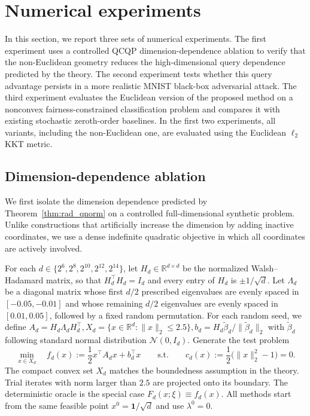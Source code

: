\documentclass[11pt]{article}
\numberwithin{equation}{section}
\begin{document}
\section{Numerical experiments}\label{sec:num}
In this section, we report three sets of numerical experiments. The first experiment uses a controlled QCQP dimension-dependence ablation to verify that the non-Euclidean geometry reduces the high-dimensional query dependence predicted by the theory. The second experiment tests whether this query advantage persists in a more realistic MNIST black-box adversarial attack. The third experiment evaluates the Euclidean version of the proposed method on a nonconvex fairness-constrained classification problem and compares it with existing stochastic zeroth-order baselines. In the first two experiments, all variants, including the non-Euclidean one, are evaluated using the Euclidean 
$\ell_2$ KKT metric.

\subsection{Dimension-dependence ablation}
\label{subsec:dimension-ablation}

We first isolate the dimension dependence predicted by {Theorem~\ref{thm:rad_qnorm}} on a controlled full-dimensional
synthetic problem. Unlike constructions that artificially increase the dimension by adding inactive coordinates, we use a dense indefinite quadratic objective in which all coordinates are actively involved.

For each
\(d\in\{2^6,2^8,2^{10},2^{12},2^{14}\}\), let \(H_d\in\mathbb R^{d\times d}\) be the normalized
Walsh--Hadamard matrix, so that \(H_d^\top H_d=I_d\) and every entry of \(H_d\) is \(\pm1/\sqrt d\).
Let \(\Lambda_d\) be a diagonal matrix whose first \(d/2\) prescribed eigenvalues are evenly spaced in
\([-0.05,-0.01]\) and whose remaining \(d/2\) eigenvalues are evenly spaced in \([0.01,0.05]\), followed by a
fixed random permutation. For each random seed, we   
define
\(
A_d=H_d\Lambda_dH_d^\top, 
X_d=\{x\in\mathbb R^d:\|x\|_2\le2.5\}, 
b_d=H_d \tilde{\beta}_d/\|\tilde{\beta}_d\|_2
\) with $\tilde{\beta}_d$ following standard normal distribution $\mathcal{N}(0,I_d)$. 
Generate the test problem 
\[
\min_{x\in X_d}\quad f_d(x):=\frac12x^\top A_dx+b_d^\top x
\qquad\text{s.t.}\qquad
c_d(x):=\frac12\bigl(\|x\|_2^2-1\bigr)=0.
\]
The compact convex set \(X_d\) matches the boundedness assumption in the theory. Trial iterates with norm
larger than \(2.5\) are projected onto its boundary. The deterministic oracle is the special case
\(F_d(x;\xi)\equiv f_d(x)\). 
All methods start from the same feasible point
$x^0=\mathbf{1}/\sqrt{d}$ and use $\lambda^0=0$.
\end{document}
